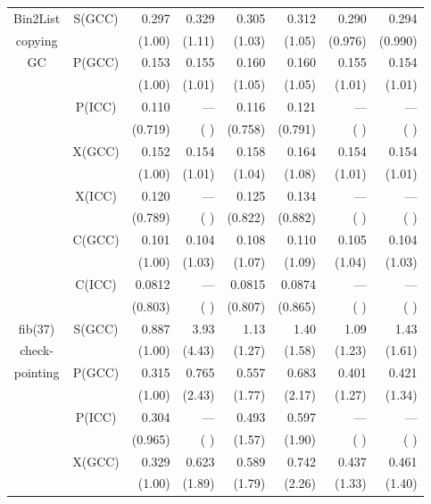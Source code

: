 \documentclass[a4j]{jarticle}
\begin{document}
\begin{table*}[!t]
\begin{center}
\begin{tabular}{|c|c|r|r|r|r|r|r|}
Bin2List   & S(GCC) & 0.297  & 0.329  & 0.305  & 0.312  & 0.290  & 0.294 \\ 
copying    &        & (1.00) & (1.11) & (1.03) & (1.05) & (0.976)&(0.990)\\ \cline{2-8}
  GC       & P(GCC) & 0.153  & 0.155  & 0.160  & 0.160  & 0.155  & 0.154 \\ 
           &        & (1.00) & (1.01) & (1.05) & (1.05) & (1.01) & (1.01)\\ \cline{2-8}
           & P(ICC) & 0.110  & ---    & 0.116  & 0.121  & ---    & ---   \\ 
           &        & (0.719)& (    ) & (0.758)& (0.791)& (    ) & (    )\\ \cline{2-8}
           & X(GCC) & 0.152  & 0.154  & 0.158  & 0.164  & 0.154  & 0.154 \\ 
           &        & (1.00) & (1.01) & (1.04) & (1.08) & (1.01) & (1.01)\\ \cline{2-8}
           & X(ICC) & 0.120  & ---    & 0.125  & 0.134  & ---    & ---   \\ 
           &        & (0.789)& (    ) & (0.822)& (0.882)& (    ) & (    )\\ \cline{2-8}
           & C(GCC) & 0.101  & 0.104  & 0.108  & 0.110  & 0.105  & 0.104 \\ 
           &        & (1.00) & (1.03) & (1.07) & (1.09) & (1.04) & (1.03)\\ \cline{2-8}
           & C(ICC) & 0.0812 & ---    & 0.0815 & 0.0874 & ---    & ---   \\ 
           &        & (0.803)& (    ) & (0.807)& (0.865)& (    ) & (    )\\ \hline
fib(37)    & S(GCC) & 0.887  & 3.93   & 1.13   & 1.40   & 1.09   & 1.43  \\ 
check-     &        & (1.00) & (4.43) & (1.27) & (1.58) & (1.23) & (1.61)\\ \cline{2-8}
pointing   & P(GCC) & 0.315  & 0.765  & 0.557  & 0.683  & 0.401  & 0.421 \\ 
           &        & (1.00) & (2.43) & (1.77) & (2.17) & (1.27) & (1.34)\\ \cline{2-8}
           & P(ICC) & 0.304  & ---    & 0.493  & 0.597  & ---    & ---   \\ 
           &        & (0.965)& (    ) & (1.57) & (1.90) & (    ) & (    )\\ \cline{2-8}
           & X(GCC) & 0.329  & 0.623  & 0.589  & 0.742  & 0.437  & 0.461 \\ 
           &        & (1.00) & (1.89) & (1.79) & (2.26) & (1.33) & (1.40)\\ \cline{2-8}

\end{tabular}
\end{center}
\end{table*}
\end{document}
